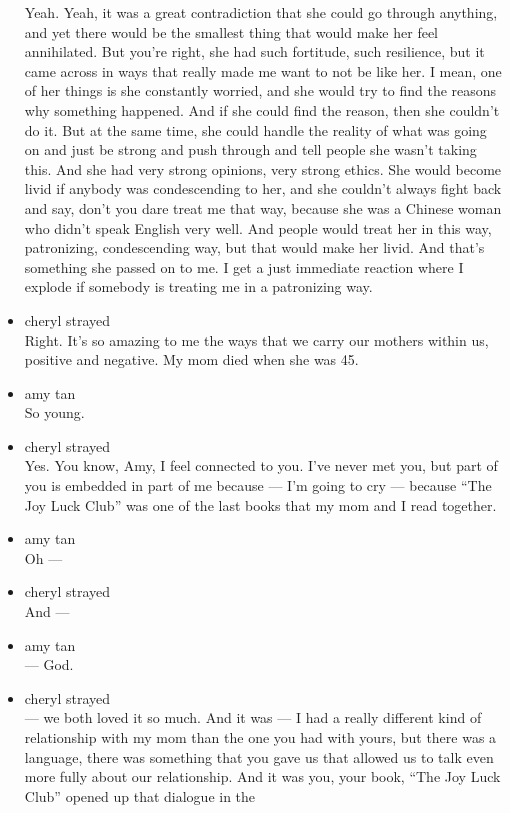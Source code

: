 \begin{itemize}
  Yeah. Yeah, it was a great contradiction that she could go through
  anything, and yet there would be the smallest thing that would make
  her feel annihilated. But you're right, she had such fortitude, such
  resilience, but it came across in ways that really made me want to not
  be like her. I mean, one of her things is she constantly worried, and
  she would try to find the reasons why something happened. And if she
  could find the reason, then she couldn't do it. But at the same time,
  she could handle the reality of what was going on and just be strong
  and push through and tell people she wasn't taking this. And she had
  very strong opinions, very strong ethics. She would become livid if
  anybody was condescending to her, and she couldn't always fight back
  and say, don't you dare treat me that way, because she was a Chinese
  woman who didn't speak English very well. And people would treat her
  in this way, patronizing, condescending way, but that would make her
  livid. And that's something she passed on to me. I get a just
  immediate reaction where I explode if somebody is treating me in a
  patronizing way.
\item
  cheryl strayed\\
  Right. It's so amazing to me the ways that we carry our mothers within
  us, positive and negative. My mom died when she was 45.
\item
  amy tan\\
  So young.
\item
  cheryl strayed\\
  Yes. You know, Amy, I feel connected to you. I've never met you, but
  part of you is embedded in part of me because --- I'm going to cry ---
  because ``The Joy Luck Club'' was one of the last books that my mom
  and I read together.
\item
  amy tan\\
  Oh ---
\item
  cheryl strayed\\
  And ---
\item
  amy tan\\
  --- God.
\item
  cheryl strayed\\
  --- we both loved it so much. And it was --- I had a really different
  kind of relationship with my mom than the one you had with yours, but
  there was a language, there was something that you gave us that
  allowed us to talk even more fully about our relationship. And it was
  you, your book, ``The Joy Luck Club'' opened up that dialogue in the

\end{itemize}
